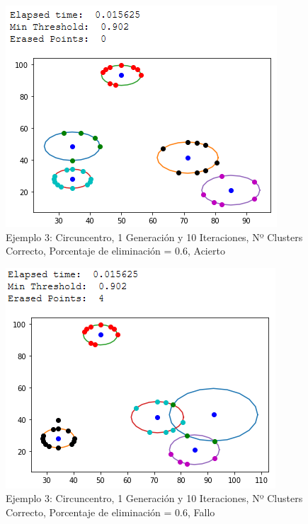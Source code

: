 \documentclass[conference,a4paper]{IEEEtran}
\begin{document}
\begin{figure}[H]
\centering
\includegraphics[scale=0.65]{Experimentacion/Ejemplo3/ej3_c_1_10_me_correct}
\caption{Ejemplo 3: Circuncentro, 1 Generación y 10 Iteraciones,  Nº Clusters Correcto, Porcentaje de eliminación = 0.6, Acierto\\}
\end{figure}

\begin{figure}[H]
\centering
\includegraphics[scale=0.65]{Experimentacion/Ejemplo3/ej3_c_1_10_me_wrong}
\caption{Ejemplo 3: Circuncentro, 1 Generación y 10 Iteraciones,  Nº Clusters Correcto, Porcentaje de eliminación = 0.6, Fallo\\}
\end{figure}
\end{document}
